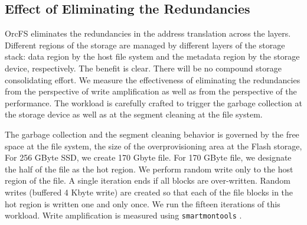 \documentclass[pageno]{jpaper}
\begin{document}

\subsection{Effect of Eliminating the Redundancies}
\label{subsec:remove_gc_overhead}

OrcFS eliminates the redundancies in the address translation across 
the layers. Different regions of the storage are managed by different 
layers of the storage stack: data region by the host file system and the 
metadata region by the storage device, respectively. The benefit is 
clear. There will be no compound storage consolidating effort. We measure 
the effectiveness of eliminating the redundancies from the perspective of 
write amplification as well as from the perspective of the performance. 
The workload is carefully crafted to trigger the garbage collection at 
the storage device as well as at the segment cleaning at the file system. 

The garbage collection and the segment cleaning behavior is governed by 
the free space at the file system, the size of the overprovisioning area 
at the Flash storage, For 256 GByte SSD, we create 170 Gbyte file. For 
170 GByte file, we designate the half of the file as the hot region. We  
perform random write only to the host region of the file. A single iteration 
ends if all blocks are over-written. Random writes (buffered 4 Kbyte write) 
are created so that each of the file blocks in the hot region is written 
one and only once. We run the fifteen iterations of this workload. Write 
amplification is measured using \texttt{smartmontools} \cite{smartmontools}.
\end{document}
